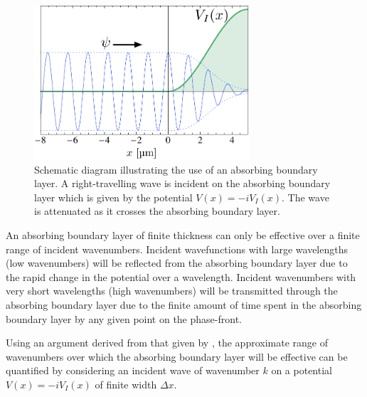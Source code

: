 \begin{figure}
    \centering
    \includegraphics[width=8cm]{AbsorbingBoundarySchematic}
    \caption{
        \label{BackgroundTheory:AbsorbingBoundarySchematic}
        Schematic diagram illustrating the use of an absorbing boundary layer. A right-travelling wave is incident on the absorbing boundary layer which is given by the potential $V(x) = -i V_I(x)$. The wave is attenuated as it crosses the absorbing boundary layer.
    }
\end{figure}

An absorbing boundary layer of finite thickness can only be effective over a finite range of incident wavenumbers. Incident wavefunctions with large wavelengths (low wavenumbers) will be reflected from the absorbing boundary layer due to the rapid change in the potential over a wavelength. Incident wavenumbers with very short wavelengths (high wavenumbers) will be transmitted through the absorbing boundary layer due to the finite amount of time spent in the absorbing boundary layer by any given point on the phase-front. 

Using an argument derived from that given by \citet{Neuhasuer:1989}, the approximate range of wavenumbers over which the absorbing boundary layer will be effective can be quantified by considering an incident wave of wavenumber $k$ on a potential $V(x) = -i V_I(x)$ of finite width $\Delta x$. 

